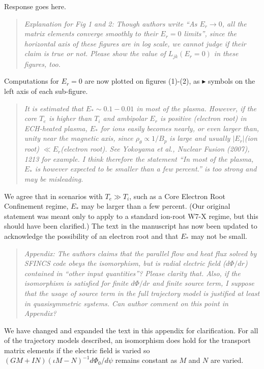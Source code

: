 \documentclass[11pt]{article}
\newcommand{\todo}[1]{{\color{red}#1}}
\newenvironment{referee}{\begin{quote}\it\color{Blue}}{\end{quote}}
\begin{document}
\todo{Response goes here.}

\begin{referee}
Explanation for Fig 1 and 2: Though authors write ``As $E_r \to 0$, all the matrix elements converge
smoothly to their $E_r = 0$ limits'', since the horizontal axis of these figures are in log scale, we
cannot judge if their claim is true or not. Please show the value of $L_{jk}(E_r=0)$ in these figures,
too.
\end{referee}

Computations for $E_r=0$ are now plotted on figures (1)-(2), as $\blacktriangleright$ symbols on the left axis
of each sub-figure.

\begin{referee}
It is estimated that $E_* \sim 0.1 - 0.01$ in most of the plasma. However, if the core $T_e$ is higher than
$T_i$ and ambipolar $E_r$ is positive (electron root) in ECH-heated plasma, $E_*$ for ions easily becomes
nearly, or even larger than, unity near the magnetic axis, since $\rho_\theta \propto 1/B_p$ is large and usually
$|E_r|$(ion root) $\ll E_r$(electron root). See Yokoyama et al., Nuclear Fusion (2007), 1213 for example.
I think therefore the statement ``In most of the plasma, $E_*$ is however expected to be smaller
than a few percent.'' is too strong and may be misleading.
\end{referee}

We agree that in scenarios with $T_e \gg T_i$, such as a Core Electron Root Confinement regime,
$E_*$ may be larger than a few percent. (Our original statement
was meant only to apply to a standard ion-root W7-X regime,
but this should have been clarified.) The text in the manuscript has now been updated to acknowledge
the possibility of an electron root and that $E_*$ may not be small. 

\begin{referee}
Appendix: The authors claims that the parallel flow and heat flux solved by SFINCS code obeys the
isomorphism, but is radial electric field ($d\Phi/dr$) contained in ``other input quantities''? Please
clarity that. Also, if the isomorphism is satisfied for finite $d\Phi/dr$ and finite source term, I
suppose that the usage of source term in the full trajectory model is justified at least in
quasisymmetric systems. Can author comment on this point in Appendix?
\end{referee}

We have changed and expanded the text in this appendix for clarification. 
For all of the trajectory models described, an isomorphism does hold for the transport matrix elements
if the electric field is varied so
$(GM+IN)(\iota M-N)^{-1} d\Phi_0/d\psi$ remains constant as $M$ and $N$ are varied.
\end{document}
